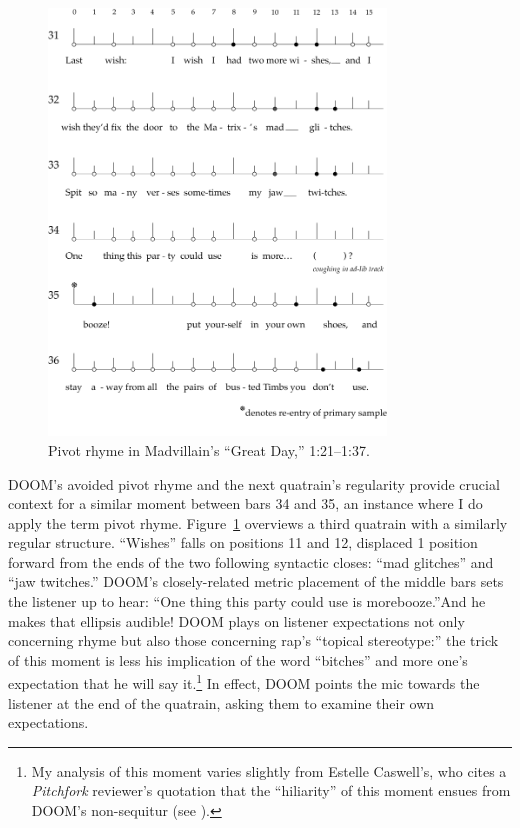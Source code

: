     \begin{figure}[!t]
        \centering
        \includegraphics[width=0.8\textwidth]{images/figures/chp 03/121137greatdayachievedpivot.pdf}
        \caption{Pivot rhyme in Madvillain's ``Great Day,'' 1:21--1:37.}
        \label{fig:doomachievedpiv}
    \end{figure}

DOOM's avoided pivot rhyme and the next quatrain's regularity provide crucial context for a similar moment 
between bars 34 and 35, an instance where I do apply the term pivot rhyme. Figure~\ref{fig:doomachievedpiv}
overviews a third quatrain with a similarly regular structure. ``Wishes''  falls on positions 11 and 12, 
displaced 1 position forward from the ends of the two following  syntactic  closes: ``mad glitches'' and
``jaw twitches.'' DOOM's closely-related metric placement of the middle bars sets the listener up to hear:
``One thing this party could use is more\textellipsis booze.''And he makes that ellipsis audible! DOOM plays
on listener expectations not only concerning rhyme but also those concerning rap's ``topical stereotype:'' 
the trick of this moment is less his implication of the word ``bitches'' and more one's expectation that
he will say it.\footnote{
    My analysis of this moment varies slightly from Estelle Caswell's, who cites a \textit{Pitchfork} 
    reviewer's quotation that the ``hiliarity'' of this moment ensues from DOOM's non-sequitur (see
    \cite{estellecaswellRappingDeconstructedBest2016}).}
In effect, DOOM points the mic towards the listener at the end of the quatrain, asking them to examine
their own expectations.

